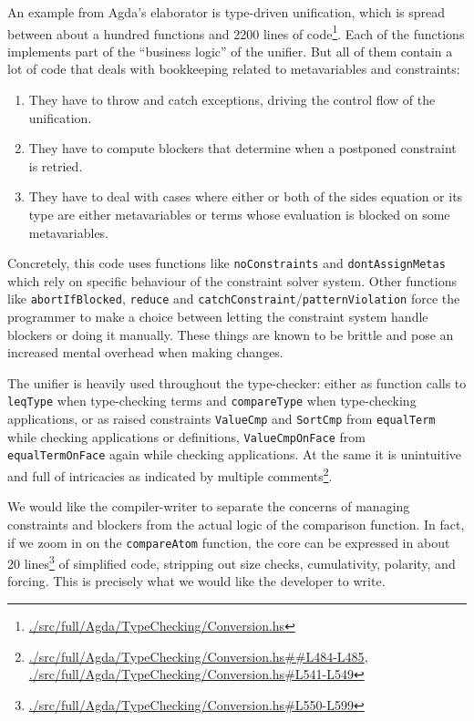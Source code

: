 \documentclass[
  sigconf,
  screen,
  review]{acmart}
\providecommand{\tightlist}{%
  \setlength{\itemsep}{0pt}\setlength{\parskip}{0pt}}
\begin{document}
An example from Agda's elaborator is type-driven unification, which is
spread between about a hundred functions and 2200 lines of
code\footnote{\href{https://github.com/agda/agda/blob/v2.6.4/src/full/Agda/TypeChecking/Conversion.hs}{./src/full/Agda/TypeChecking/Conversion.hs}}.
Each of the functions implements part of the ``business logic'' of the
unifier. But all of them contain a lot of code that deals with
bookkeeping related to metavariables and constraints:

\begin{enumerate}
\def\labelenumi{\arabic{enumi}.}
\tightlist
\item
  They have to throw and catch exceptions, driving the control flow of
  the unification.
\item
  They have to compute blockers that determine when a postponed
  constraint is retried.
\item
  They have to deal with cases where either or both of the sides
  equation or its type are either metavariables or terms whose
  evaluation is blocked on some metavariables.
\end{enumerate}

Concretely, this code uses functions like \texttt{noConstraints} and
\texttt{dontAssignMetas} which rely on specific behaviour of the
constraint solver system. Other functions like \texttt{abortIfBlocked},
\texttt{reduce} and \texttt{catchConstraint}/\texttt{patternViolation}
force the programmer to make a choice between letting the constraint
system handle blockers or doing it manually. These things are known to
be brittle and pose an increased mental overhead when making changes.

The unifier is heavily used throughout the type-checker: either as
function calls to \texttt{leqType} when type-checking terms and
\texttt{compareType} when type-checking applications, or as raised
constraints \texttt{ValueCmp} and \texttt{SortCmp} from
\texttt{equalTerm} while checking applications or definitions,
\texttt{ValueCmpOnFace} from \texttt{equalTermOnFace} again while
checking applications. At the same it is unintuitive and full of
intricacies as indicated by multiple comments\footnote{\href{https://github.com/agda/agda/blob/v2.6.4/src/full/Agda/TypeChecking/Conversion.hs\#L484-L485}{./src/full/Agda/TypeChecking/Conversion.hs\#\#L484-L485},
  \href{https://github.com/agda/agda/blob/v2.6.4/src/full/Agda/TypeChecking/Conversion.hs\#L541-L549}{./src/full/Agda/TypeChecking/Conversion.hs\#L541-L549}}.

We would like the compiler-writer to separate the concerns of managing
constraints and blockers from the actual logic of the comparison
function. In fact, if we zoom in on the \texttt{compareAtom} function,
the core can be expressed in about 20 lines\footnote{\href{https://github.com/agda/agda/blob/v2.6.4/src/full/Agda/TypeChecking/Conversion.hs\#L550-L599}{./src/full/Agda/TypeChecking/Conversion.hs\#L550-L599}}
of simplified code, stripping out size checks, cumulativity, polarity,
and forcing. This is precisely what we would like the developer to
write.
\end{document}
